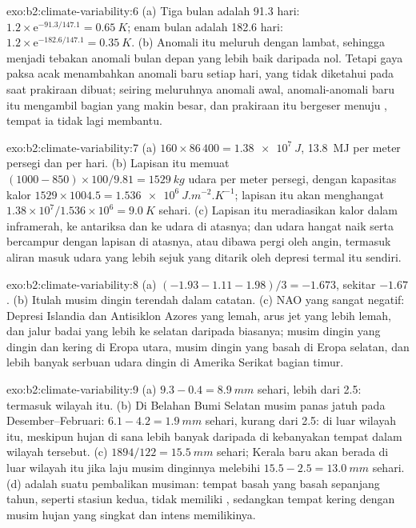 \begin{solution}{exo:b2:climate-variability:6}
(a) Tiga bulan adalah 91.3 hari: $1.2 \times \mathrm{e}^{-91.3/147.1} = \qty{0.65}{K}$; enam bulan
adalah 182.6 hari: $1.2 \times \mathrm{e}^{-182.6/147.1} = \qty{0.35}{K}$. (b) Anomali itu meluruh
dengan lambat, sehingga menjadi tebakan anomali bulan depan yang lebih baik daripada nol. Tetapi gaya paksa acak menambahkan
anomali baru setiap hari, yang tidak diketahui pada saat prakiraan dibuat; seiring meluruhnya anomali awal,
anomali-anomali baru itu mengambil bagian yang makin besar, dan prakiraan itu bergeser menuju , tempat ia tidak
lagi membantu.
\end{solution}

\begin{solution}{exo:b2:climate-variability:7}
(a) $160 \times 86\,400 = \qty{1.38e7}{J}$, \qty{13.8}{MJ} per meter persegi dan per hari. (b) Lapisan
itu memuat $(1000 - 850) \times 100/9.81 = \qty{1529}{kg}$ udara per meter persegi, dengan kapasitas
kalor $1529 \times 1004.5 = \qty{1.536e6}{J.m^{-2}.K^{-1}}$; lapisan itu akan menghangat $1.38 \times
10^7/1.536 \times 10^6 = \qty{9.0}{K}$ sehari. (c) Lapisan itu meradiasikan kalor dalam inframerah, ke
antariksa dan ke udara di atasnya; dan udara hangat naik serta bercampur dengan lapisan di atasnya, atau
dibawa pergi oleh angin, termasuk aliran masuk udara yang lebih sejuk yang ditarik oleh depresi termal itu sendiri.
\end{solution}

\begin{solution}{exo:b2:climate-variability:8}
(a) $(-1.93 - 1.11 - 1.98)/3 = -1.673$, sekitar $-1.67$. (b) Itulah musim dingin terendah dalam catatan.
(c) NAO yang sangat negatif: Depresi Islandia dan Antisiklon Azores yang lemah, arus jet yang lebih lemah, dan jalur badai
yang lebih ke selatan daripada biasanya; musim dingin yang dingin dan kering di Eropa utara, musim dingin yang basah di Eropa selatan,
dan lebih banyak serbuan udara dingin di Amerika Serikat bagian timur.
\end{solution}

\begin{solution}{exo:b2:climate-variability:9}
(a) $9.3 - 0.4 = \qty{8.9}{mm}$ sehari, lebih dari 2.5: termasuk wilayah itu. (b) Di Belahan Bumi Selatan
musim panas jatuh pada Desember--Februari: $6.1 - 4.2 = \qty{1.9}{mm}$ sehari, kurang dari 2.5: di luar wilayah itu,
meskipun hujan di sana lebih banyak daripada di kebanyakan tempat dalam wilayah tersebut. (c) $1894/122 = \qty{15.5}{mm}$
sehari; Kerala baru akan berada di luar wilayah itu jika laju musim dinginnya melebihi $15.5 - 2.5 = \qty{13.0}{mm}$ sehari.
(d)  adalah suatu pembalikan musiman: tempat basah yang basah sepanjang tahun, seperti stasiun
kedua, tidak memiliki , sedangkan tempat kering dengan musim hujan yang singkat dan intens memilikinya.
\end{solution}

